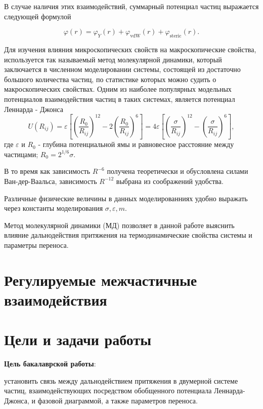 В случае наличия этих взаимодействий, суммарный потенциал частиц выражается следующей формулой

\begin{equation}
\varphi(r)=\varphi_{Y}(r)+\varphi_{\mathrm{vdW}}(r)+\varphi_{\mathrm{steric}}(r).
\end{equation}

Для изучения влияния микроскопических свойств на макроскопические свойства, используется так называемый метод молекулярной динамики, который заключается в численном моделировании системы, состоящей из достаточно большого количества частиц, по статистике которых можно судить о макроскопических свойствах. Одним из наиболее популярных модельных потенциалов взаимодействия частиц в таких системах, является потенциал Леннарда - Джонса 
\begin{equation}
U\left(R_{i j}\right)=\varepsilon\left[\left(\frac{R_{0}}{R_{i j}}\right)^{12}-2\left(\frac{R_{0}}{R_{i j}}\right)^{6}\right]=4 \varepsilon\left[\left(\frac{\sigma}{R_{i j}}\right)^{12}-\left(\frac{\sigma}{R_{i j}}\right)^{6}\right], 
\label{eqFullLJ}
\end{equation}
где $\varepsilon$ и $R_0$ - глубина потенциальной ямы и равновесное расстояние между частицами; $R_0 = 2^{1/6}\sigma$.

В то время как зависимость $R^{-6}$ получена теоретически и обусловлена силами Ван-дер-Ваальса, зависимость $R^{-12}$ выбрана из соображений удобства.

Различные физические величины в данных моделированниях удобно выражать через константы моделирования $\sigma, \varepsilon, m$.

Метод молекулярной динамики (МД) позволяет в данной работе выяснить влияние дальнодействия притяжения на термодинамические свойства системы и параметры переноса.

\section{Регулируемые межчастичные взаимодействия}\label{C1_2}



\section{Цели и задачи работы}

\textbf{Цель бакалаврской работы}:

установить связь между дальнодействием притяжения в двумерной системе частиц, взаимодействующих посредством обобщенного потенциала Леннарда-Джонса, и фазовой диаграммой, а также параметров переноса.
